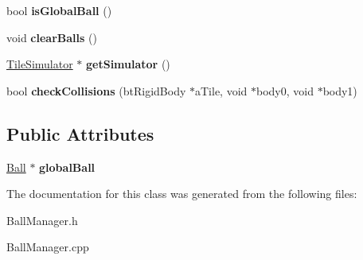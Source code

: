 \begin{DoxyCompactItemize}
\item 
\hypertarget{classBallManager_a72cf25f9ffa0152ca83103ed96ce1fe9}{bool {\bfseries is\-Global\-Ball} ()}\label{classBallManager_a72cf25f9ffa0152ca83103ed96ce1fe9}

\item 
\hypertarget{classBallManager_af51544444357484c9e58bd63f443de57}{void {\bfseries clear\-Balls} ()}\label{classBallManager_af51544444357484c9e58bd63f443de57}

\item 
\hypertarget{classBallManager_a73c4e097e977317ebdb53c32fe72441b}{\hyperlink{classTileSimulator}{Tile\-Simulator} $\ast$ {\bfseries get\-Simulator} ()}\label{classBallManager_a73c4e097e977317ebdb53c32fe72441b}

\item 
\hypertarget{classBallManager_aaaa28fd371dc2b04d5973f0a8ef6f956}{bool {\bfseries check\-Collisions} (bt\-Rigid\-Body $\ast$a\-Tile, void $\ast$body0, void $\ast$body1)}\label{classBallManager_aaaa28fd371dc2b04d5973f0a8ef6f956}

\end{DoxyCompactItemize}
\subsection*{Public Attributes}
\begin{DoxyCompactItemize}
\item 
\hypertarget{classBallManager_a9fbb6953ccffca39d124c4867a03d6e5}{\hyperlink{classBall}{Ball} $\ast$ {\bfseries global\-Ball}}\label{classBallManager_a9fbb6953ccffca39d124c4867a03d6e5}

\end{DoxyCompactItemize}


The documentation for this class was generated from the following files\-:\begin{DoxyCompactItemize}
\item 
Ball\-Manager.\-h\item 
Ball\-Manager.\-cpp\end{DoxyCompactItemize}
